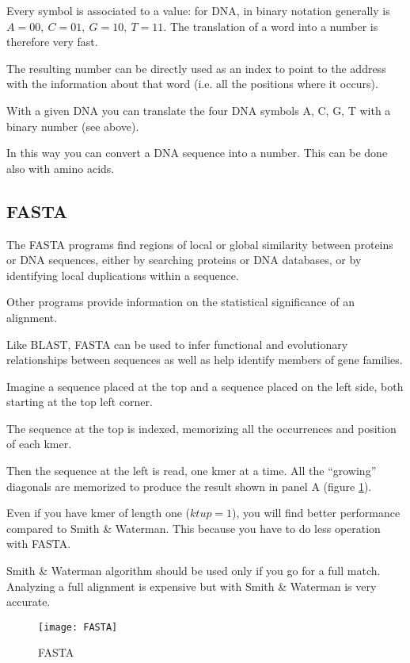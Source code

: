 Every symbol is associated to a value: for DNA, in binary notation
generally is $A=00,\ C=01,\ G=10,\ T=11$. The translation of a word into a
number is therefore very fast.

The resulting number can be directly used as an index to point
to the address with the information about that word (i.e. all the positions
where it occurs).

With a given DNA you can translate the four DNA symbols A, C, G, T with a
binary number (see above).

In this way you can convert a DNA sequence into a number.
This can be done also with amino acids.

\subsection{FASTA}

The FASTA programs find regions of local or global similarity between
proteins or DNA sequences, either by searching proteins or DNA databases, or by
identifying local duplications within a sequence.

Other programs provide information on the statistical significance of an
alignment.

Like BLAST, FASTA can be used to infer functional and evolutionary relationships
between sequences as well as help identify members of gene families.

Imagine a sequence placed at the top and a sequence placed on the left side,
both starting at the top left corner.

The sequence at the top is indexed, memorizing all the occurrences and
position of each kmer.

Then the sequence at the left is read, one kmer at a time.
All the ``growing'' diagonals are memorized to produce the result shown
in panel A (figure \ref{fig:fasta}).

Even if you have kmer of length one ($ktup = 1$), you will find better
performance compared to Smith \& Waterman. This because you have to do less
operation with FASTA.

Smith \& Waterman algorithm should be used only if you go for a full match.
Analyzing a full alignment is expensive but with Smith \& Waterman
is very accurate.

\begin{figure}[H]
  \centering
  \texttt{[image: FASTA]}
  \caption{FASTA}
  \label{fig:fasta}
\end{figure}

